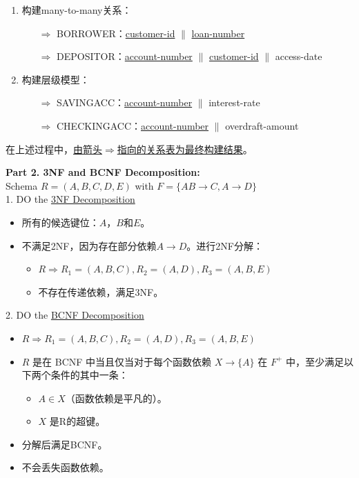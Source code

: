 \documentclass[b5paper, twoside]{article}
\let\oldtextbf\textbf
\renewcommand{\textbf}[1]{\textcolor{myblue}{\oldtextbf{#1}}}
\begin{document}
\begin{enumerate}
\begin{itemize}
	\end{itemize}
	\item 构建many-to-many关系：
	\begin{itemize}
		\item[$\Rightarrow$] BORROWER：\underline{customer-id} $\|$ 
		\underline{loan-number}
		\item[$\Rightarrow$] DEPOSITOR：\underline{account-number} $\|$ 
		\underline{customer-id} $\|$ access-date 
	\end{itemize}
	\item 构建层级模型：
	\begin{itemize}
		\item[$\Rightarrow$] SAVINGACC：\underline{account-number} $\|$ 
		interest-rate
		\item[$\Rightarrow$] CHECKINGACC：\underline{account-number} $\|$ 
		overdraft-amount
	\end{itemize}
\end{enumerate}

在上述过程中，\underline{由箭头$\Rightarrow$指向的关系表为最终构建结果}。

\textbf{Part 2. 3NF and BCNF Decomposition:}
\\Schema $R=(A,B,C,D,E)$ with $F=\{AB\rightarrow C, A\rightarrow D\}$
\\1. DO the \underline{3NF Decomposition}
\begin{itemize}
	\item 所有的候选键位：$A$，$B$和$E$。
	\item 不满足2NF，因为存在部分依赖$A\rightarrow D$。进行2NF分解：
	\begin{itemize}
		\item $R\Rightarrow R_1=(A,B,C), R_2=(A, D), R_3=(A,B,E)$
		\item 不存在传递依赖，满足3NF。
	\end{itemize}
\end{itemize}
2. DO the \underline{BCNF Decomposition}
\begin{itemize}
	\item $R\Rightarrow R_1=(A,B,C), R_2=(A, D), R_3=(A,B,E)$
	\item $R$ 是在 BCNF 中当且仅当对于每个函数依赖 $X \rightarrow \{A\}$ 在 $F^+$ 
	中，至少满足以下两个条件的其中一条：
	\begin{itemize}
		\item $A \in X$（函数依赖是平凡的）。
		\item $X$ 是R的超键。
	\end{itemize}
	\item 分解后满足BCNF。
	\item 不会丢失函数依赖。
\end{itemize}
\label{toc}
\end{document}
